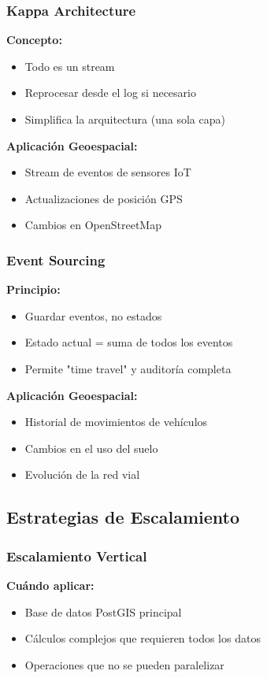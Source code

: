 \documentclass[11pt,a4paper]{article}
\begin{document}
\subsubsection{Kappa Architecture}
\textbf{Concepto:}
\begin{itemize}
    \item Todo es un stream
    \item Reprocesar desde el log si necesario
    \item Simplifica la arquitectura (una sola capa)
\end{itemize}

\textbf{Aplicación Geoespacial:}
\begin{itemize}
    \item Stream de eventos de sensores IoT
    \item Actualizaciones de posición GPS
    \item Cambios en OpenStreetMap
\end{itemize}

\subsubsection{Event Sourcing}
\textbf{Principio:}
\begin{itemize}
    \item Guardar eventos, no estados
    \item Estado actual = suma de todos los eventos
    \item Permite "time travel" y auditoría completa
\end{itemize}

\textbf{Aplicación Geoespacial:}
\begin{itemize}
    \item Historial de movimientos de vehículos
    \item Cambios en el uso del suelo
    \item Evolución de la red vial
\end{itemize}

\subsection{Estrategias de Escalamiento}

\subsubsection{Escalamiento Vertical}
\textbf{Cuándo aplicar:}
\begin{itemize}
    \item Base de datos PostGIS principal
    \item Cálculos complejos que requieren todos los datos
    \item Operaciones que no se pueden paralelizar
\end{itemize}
\end{document}
